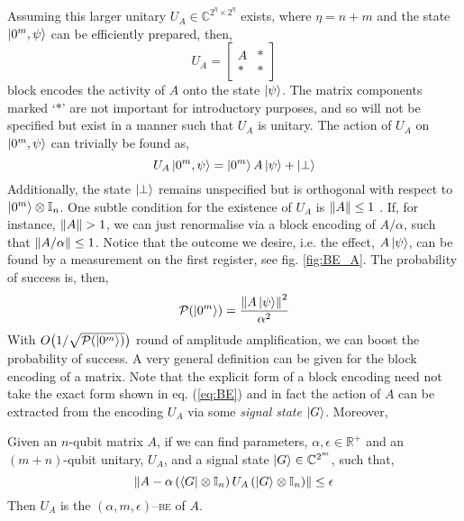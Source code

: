 \documentclass{article}
\begin{document}
Assuming this larger unitary $U_A\in\mathbb{C}^{2^\eta\times 2^\eta}$ exists, where $\eta = n+m$ and the state $\ket{0^m,\psi}$ can be efficiently prepared, then,
\begin{equation}\label{eq:BE}
    U_A = \begin{bmatrix}A & * \\ * & *\end{bmatrix}
\end{equation}
block encodes the activity of $A$ onto the state $\ket{\psi}$. The matrix components marked `$*$' are not important for introductory purposes, and so will not be specified but exist in a manner such that $U_A$ is unitary. The action of $U_A$ on $\ket{0^m,\psi}$ can trivially be found as,
\begin{equation}\label{eq:BE_states}
    U_A\ket{0^m,\psi} = \ket{0^m}A\ket{\psi} + \ket{\perp}
\end{equation}
Additionally, the state $\ket{\perp}$ remains unspecified but is orthogonal with respect to $\ket{0^m}\otimes \mathbb{I}_n$. One subtle condition for the existence of $U_A$ is $\norm{A}\leq 1$ \cite{CLBY23}. If, for instance, $\norm{A}>1$, we can just renormalise via a block encoding of $A/\alpha$, such that $\norm{A/\alpha}\leq 1$. Notice that the outcome we desire, i.e. the effect, $A\ket{\psi}$, can be found by a measurement on the first register, see fig. \ref{fig:BE_A}. The probability of success is, then,
\begin{equation}
    \mathcal{P}(\ket{0^m}) = \frac{\norm{A\ket{\psi}}^2}{\alpha^2}
\end{equation}
With $O\big(1/\sqrt{\mathcal{P}(\ket{0^m})}\big)$ round of amplitude amplification, we can boost the probability of success. A very general definition can be given for the block encoding of a matrix. Note that the explicit form of a block encoding need not take the exact form shown in eq. (\ref{eq:BE}) and in fact the action of $A$ can be extracted from the encoding $U_A$ via some \emph{signal state} $\ket{G}$. Moreover,
\begin{defn}{\textnormal{\cite{LinLin22,LC19}}}

    \noindent Given an $n$-qubit matrix $A$, if we can find parameters, $\alpha, \epsilon \in \mathbb{R}^+$ and an $(m+n)$-qubit unitary, $U_A$, and a signal state $\ket{G}\in\mathbb{C}^{2^m}$, such that, 
    \begin{equation}
    \norm{A - \alpha \left(\bra{G}\otimes\mathbb{I}_n\right)U_A\left(\ket{G}\otimes\mathbb{I}_n\right)} \leq \epsilon
    \end{equation}
    Then $U_A$ is the $(\alpha, m, \epsilon)$--\textsc{be} of $A$.
\end{defn}
\end{document}
